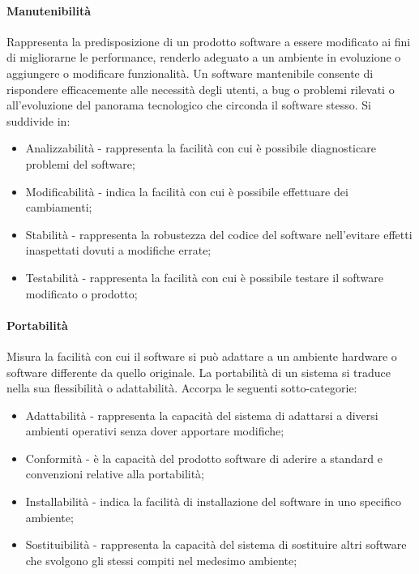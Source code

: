 \documentclass[10pt]{article}
\begin{document}
\begin{justify}
            \paragraph{Manutenibilità}
            Rappresenta la predisposizione di un prodotto software a essere modificato ai fini di migliorarne le performance, renderlo adeguato a un ambiente in evoluzione
            o aggiungere o modificare funzionalità. Un software mantenibile consente di rispondere efficacemente alle necessità degli utenti, a bug o problemi rilevati o
            all'evoluzione del panorama tecnologico che circonda il software stesso. Si suddivide in:
            \begin{itemize}
                \item Analizzabilità - rappresenta la facilità con cui è possibile diagnosticare problemi del software;
                \item Modificabilità - indica la facilità con cui è possibile effettuare dei cambiamenti;
                \item Stabilità - rappresenta la robustezza del codice del software nell'evitare effetti inaspettati dovuti a modifiche errate;
                \item Testabilità - rappresenta la facilità con cui è possibile testare il software modificato o prodotto;
            \end{itemize}

            \paragraph{Portabilità}
            Misura la facilità con cui il software si può adattare a un ambiente hardware o software differente da quello originale. La portabilità di un sistema si
            traduce nella sua flessibilità o adattabilità. Accorpa le seguenti sotto-categorie:
            \begin{itemize}
                \item Adattabilità - rappresenta la capacità del sistema di adattarsi a diversi ambienti operativi senza dover apportare modifiche;
                \item Conformità - è la capacità del prodotto software di aderire a standard e convenzioni relative alla portabilità;
                \item Installabilità - indica la facilità di installazione del software in uno specifico ambiente;
                \item Sostituibilità - rappresenta la capacità del sistema di sostituire altri software che svolgono gli stessi compiti nel medesimo ambiente;
            \end{itemize}


\end{justify}
\end{document}
